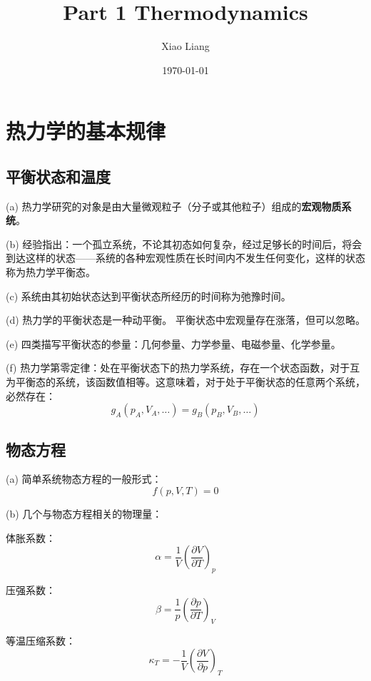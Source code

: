 \documentclass[UTF8]{ctexart}
\title{Part 1  Thermodynamics}
\author{Xiao Liang}
\date{\today}
\newcommand{\minisection}{\subsection}
\newcommand{\backdoc}{\normalsize}
\begin{document}
	\maketitle
	\tableofcontents
	
	\newpage
	\section{热力学的基本规律}
	\minisection{平衡状态和温度}
	
	\backdoc
	(a) 热力学研究的对象是由大量微观粒子（分子或其他粒子）组成的\textbf{宏观物质系统}。
	
	(b) 经验指出：一个孤立系统，不论其初态如何复杂，经过足够长的时间后，将会到达这样的状态——系统的各种宏观性质在长时间内不发生任何变化，这样的状态称为热力学平衡态。
	
	(c) 系统由其初始状态达到平衡状态所经历的时间称为弛豫时间。
	
	(d) 热力学的平衡状态是一种动平衡。 平衡状态中宏观量存在涨落，但可以忽略。
	
	(e) 四类描写平衡状态的参量：几何参量、力学参量、电磁参量、化学参量。
	
	(f) 热力学第零定律：处在平衡状态下的热力学系统，存在一个状态函数，对于互为平衡态的系统，该函数值相等。这意味着，对于处于平衡状态的任意两个系统，必然存在：
	\begin{equation}
	g_{A}\left(p_{A}, V_{A}, \ldots\right)=g_{B}\left(p_{B}, V_{B}, \ldots\right) 
	\end{equation}
	\minisection{物态方程}
	
	\backdoc
	(a) 简单系统物态方程的一般形式：
	\begin{equation}
	f(p, V, T)=0
	\end{equation}
	
	(b) 几个与物态方程相关的物理量：
	
	体胀系数：
	\begin{equation}
	\alpha=\frac{1}{V}\left(\frac{\partial V}{\partial T}\right)_{p}
	\end{equation}
	
	压强系数：
	\begin{equation}
	\beta=\frac{1}{p}\left(\frac{\partial p}{\partial T}\right)_{V}
	\end{equation}
	
	等温压缩系数：
	\begin{equation}
	\kappa_{T}=-\frac{1}{V}\left(\frac{\partial V}{\partial p}\right)_{T}
	\end{equation}
	
\end{document}
